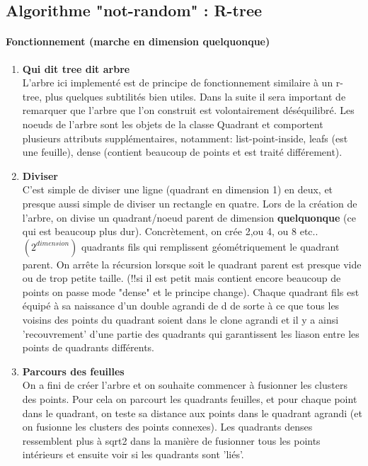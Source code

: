 \documentclass[a4paper,11pt]{article}
\begin{document}
\subsection{Algorithme "not-random" : R-tree}
    \paragraph{Fonctionnement (marche en dimension quelquonque)}
    \begin{enumerate}
        \item \textbf{Qui dit tree dit arbre}\\
        L'arbre ici implementé est de principe de fonctionnement similaire à un r-tree,
        plus quelques subtilités bien utiles. Dans la suite il sera important de remarquer que l'arbre que l'on construit est volontairement déséquilibré. Les noeuds de l'arbre sont les objets de la classe Quadrant et comportent plusieurs attributs supplémentaires, notamment: list-point-inside, leafs (est une feuille), dense (contient beaucoup de points et est traité différement).
        \item \textbf{Diviser}\\
        C'est simple de diviser une ligne (quadrant en dimension 1) en deux, et presque aussi simple de diviser un rectangle en quatre. Lors de la création de l'arbre, on divise un quadrant/noeud parent de dimension \textbf{quelquonque} (ce qui est beaucoup plus dur).
        \smallbreak
        Concrètement, on crée 2,ou 4, ou 8 etc.. $(2^{dimension})$ quadrants fils qui remplissent géométriquement le quadrant parent.
        \smallbreak
        On arrête la récursion lorsque soit le quadrant parent est presque vide ou de trop petite taille. (!!si il est petit mais contient encore beaucoup de points on passe mode "dense" et le principe change).
	Chaque quadrant fils est équipé à sa naissance d'un double agrandi de d de sorte à ce que tous les voisins des points du quadrant soient dans le clone agrandi et il y a ainsi 'recouvrement' d'une partie des quadrants qui garantissent les liason entre les points de quadrants différents.
        \item \textbf{Parcours des feuilles}\\
	On a fini de créer l'arbre et on souhaite commencer à fusionner les clusters des points.
        Pour cela on parcourt les quadrants feuilles, et pour chaque point dans le quadrant, on teste sa distance aux points dans le quadrant agrandi (et on fusionne les clusters des points connexes). 
        Les quadrants denses ressemblent plus à sqrt2 dans la manière de fusionner tous les points intérieurs et ensuite voir si les quadrants sont 'liés'.

\end{enumerate}
\end{document}
